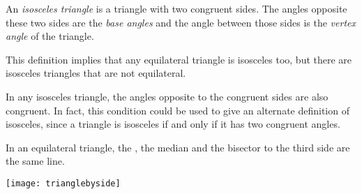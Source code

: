\documentclass[12pt]{article}
\begin{document}
An \emph{isosceles triangle} is a triangle with two congruent sides.  The angles opposite these two sides are the {\em base angles} and the angle between those sides is the {\em vertex angle} of the triangle.

This definition implies that any equilateral triangle is isosceles
too, but there are isosceles triangles that are not equilateral.

In any isosceles triangle, the angles opposite to the congruent sides
are also congruent.  In fact, this condition could be used to give an
alternate definition of isosceles, since a triangle is isosceles if
and only if it has two congruent angles.

In an equilateral triangle, the , the median and the bisector to
the third side are the same line.

\texttt{[image: trianglebyside]}


\end{document}
